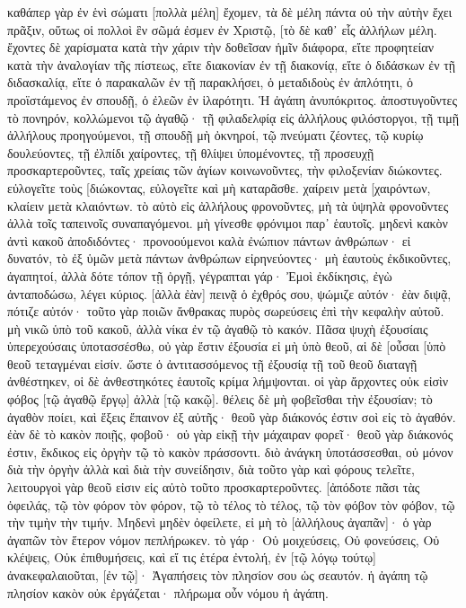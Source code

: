 καθάπερ γὰρ ἐν ἑνὶ σώματι [πολλὰ μέλη] ἔχομεν, τὰ δὲ μέλη πάντα οὐ τὴν αὐτὴν ἔχει πρᾶξιν, 
οὕτως οἱ πολλοὶ ἓν σῶμά ἐσμεν ἐν Χριστῷ, [τὸ δὲ καθ᾽ εἷς ἀλλήλων μέλη. 
ἔχοντες δὲ χαρίσματα κατὰ τὴν χάριν τὴν δοθεῖσαν ἡμῖν διάφορα, εἴτε προφητείαν κατὰ τὴν ἀναλογίαν τῆς πίστεως, 
εἴτε διακονίαν ἐν τῇ διακονίᾳ, εἴτε ὁ διδάσκων ἐν τῇ διδασκαλίᾳ, 
εἴτε ὁ παρακαλῶν ἐν τῇ παρακλήσει, ὁ μεταδιδοὺς ἐν ἁπλότητι, ὁ προϊστάμενος ἐν σπουδῇ, ὁ ἐλεῶν ἐν ἱλαρότητι. 
Ἡ ἀγάπη ἀνυπόκριτος. ἀποστυγοῦντες τὸ πονηρόν, κολλώμενοι τῷ ἀγαθῷ· 
τῇ φιλαδελφίᾳ εἰς ἀλλήλους φιλόστοργοι, τῇ τιμῇ ἀλλήλους προηγούμενοι, 
τῇ σπουδῇ μὴ ὀκνηροί, τῷ πνεύματι ζέοντες, τῷ κυρίῳ δουλεύοντες, 
τῇ ἐλπίδι χαίροντες, τῇ θλίψει ὑπομένοντες, τῇ προσευχῇ προσκαρτεροῦντες, 
ταῖς χρείαις τῶν ἁγίων κοινωνοῦντες, τὴν φιλοξενίαν διώκοντες. 
εὐλογεῖτε τοὺς [διώκοντας, εὐλογεῖτε καὶ μὴ καταρᾶσθε. 
χαίρειν μετὰ [χαιρόντων, κλαίειν μετὰ κλαιόντων. 
τὸ αὐτὸ εἰς ἀλλήλους φρονοῦντες, μὴ τὰ ὑψηλὰ φρονοῦντες ἀλλὰ τοῖς ταπεινοῖς συναπαγόμενοι. μὴ γίνεσθε φρόνιμοι παρ᾽ ἑαυτοῖς. 
μηδενὶ κακὸν ἀντὶ κακοῦ ἀποδιδόντες· προνοούμενοι καλὰ ἐνώπιον πάντων ἀνθρώπων· 
εἰ δυνατόν, τὸ ἐξ ὑμῶν μετὰ πάντων ἀνθρώπων εἰρηνεύοντες· 
μὴ ἑαυτοὺς ἐκδικοῦντες, ἀγαπητοί, ἀλλὰ δότε τόπον τῇ ὀργῇ, γέγραπται γάρ· Ἐμοὶ ἐκδίκησις, ἐγὼ ἀνταποδώσω, λέγει κύριος. 
[ἀλλὰ ἐὰν] πεινᾷ ὁ ἐχθρός σου, ψώμιζε αὐτόν· ἐὰν διψᾷ, πότιζε αὐτόν· τοῦτο γὰρ ποιῶν ἄνθρακας πυρὸς σωρεύσεις ἐπὶ τὴν κεφαλὴν αὐτοῦ. 
μὴ νικῶ ὑπὸ τοῦ κακοῦ, ἀλλὰ νίκα ἐν τῷ ἀγαθῷ τὸ κακόν. 
Πᾶσα ψυχὴ ἐξουσίαις ὑπερεχούσαις ὑποτασσέσθω, οὐ γὰρ ἔστιν ἐξουσία εἰ μὴ ὑπὸ θεοῦ, αἱ δὲ [οὖσαι [ὑπὸ θεοῦ τεταγμέναι εἰσίν. 
ὥστε ὁ ἀντιτασσόμενος τῇ ἐξουσίᾳ τῇ τοῦ θεοῦ διαταγῇ ἀνθέστηκεν, οἱ δὲ ἀνθεστηκότες ἑαυτοῖς κρίμα λήμψονται. 
οἱ γὰρ ἄρχοντες οὐκ εἰσὶν φόβος [τῷ ἀγαθῷ ἔργῳ] ἀλλὰ [τῷ κακῷ]. θέλεις δὲ μὴ φοβεῖσθαι τὴν ἐξουσίαν; τὸ ἀγαθὸν ποίει, καὶ ἕξεις ἔπαινον ἐξ αὐτῆς· 
θεοῦ γὰρ διάκονός ἐστιν σοὶ εἰς τὸ ἀγαθόν. ἐὰν δὲ τὸ κακὸν ποιῇς, φοβοῦ· οὐ γὰρ εἰκῇ τὴν μάχαιραν φορεῖ· θεοῦ γὰρ διάκονός ἐστιν, ἔκδικος εἰς ὀργὴν τῷ τὸ κακὸν πράσσοντι. 
διὸ ἀνάγκη ὑποτάσσεσθαι, οὐ μόνον διὰ τὴν ὀργὴν ἀλλὰ καὶ διὰ τὴν συνείδησιν, 
διὰ τοῦτο γὰρ καὶ φόρους τελεῖτε, λειτουργοὶ γὰρ θεοῦ εἰσιν εἰς αὐτὸ τοῦτο προσκαρτεροῦντες. 
[ἀπόδοτε πᾶσι τὰς ὀφειλάς, τῷ τὸν φόρον τὸν φόρον, τῷ τὸ τέλος τὸ τέλος, τῷ τὸν φόβον τὸν φόβον, τῷ τὴν τιμὴν τὴν τιμήν. 
Μηδενὶ μηδὲν ὀφείλετε, εἰ μὴ τὸ [ἀλλήλους ἀγαπᾶν]· ὁ γὰρ ἀγαπῶν τὸν ἕτερον νόμον πεπλήρωκεν. 
τὸ γάρ· Οὐ μοιχεύσεις, Οὐ φονεύσεις, Οὐ κλέψεις, Οὐκ ἐπιθυμήσεις, καὶ εἴ τις ἑτέρα ἐντολή, ἐν [τῷ λόγῳ τούτῳ] ἀνακεφαλαιοῦται, [ἐν τῷ]· Ἀγαπήσεις τὸν πλησίον σου ὡς σεαυτόν. 
ἡ ἀγάπη τῷ πλησίον κακὸν οὐκ ἐργάζεται· πλήρωμα οὖν νόμου ἡ ἀγάπη. 
